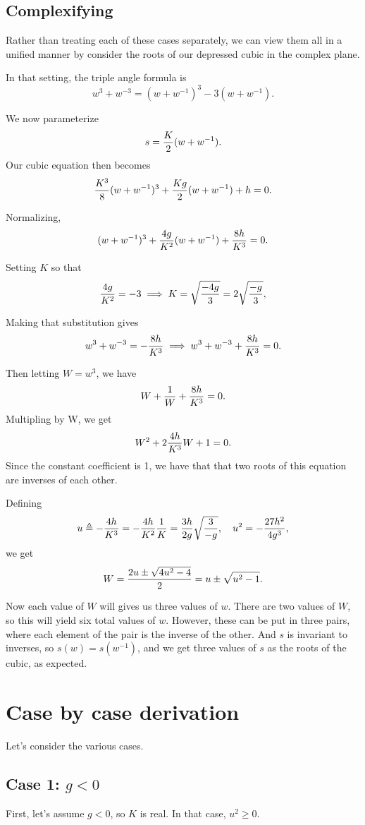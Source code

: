 \documentclass[10pt]{article}
\begin{document}
\subsection*{Complexifying}
Rather than treating each of these cases separately, we can view them all in a unified manner by consider the roots of our depressed cubic in the complex plane.

In that setting, the triple angle formula is $$ w^3 + w^{-3} = (w + w^{-1})^3 - 3 (w + w^{-1}).$$

We now parameterize $$ s = {K \over 2} (w + w^{-1}).$$ Our cubic  equation then becomes
$$ {K^3 \over 8} (w + w^{-1})^3 + {K g \over 2}(w + w^{-1}) + h = 0.$$

Normalizing,
$$ (w + w^{-1})^3 + {4 g \over K^2} (w + w^{-1}) + {8 h \over K^3} = 0.$$

Setting $K$ so that $$ {4 g \over K^2} = -3 \implies K = \sqrt {-4 g \over 3} = 2 \sqrt{-g \over 3},$$

Making that substitution gives $$ w^3 + w^{-3} = -{ 8 h \over K^3} \implies w^3 + w^{-3} + {8 h \over K^3} = 0.$$

Then letting $W = w^3$, we have $$ W + {1 \over W} + {8h \over K^3} = 0.$$
Multipling by W, we get $$ W^2 + 2 {4 h \over K^3} W + 1 =  0.$$ Since the constant coefficient is 1, we have that that two roots of this equation are inverses of each other.

Defining $$ u \triangleq -{4 h \over K^3} = -{4 h \over K^2}{1 \over K} = { 3 h \over 2 g} \sqrt{ 3 \over -g}, \quad u^2 = -{27 h^2 \over 4 g^3}, $$ we get  $$ W =  {2 u \pm \sqrt{4 u^2 - 4} \over 2} = u \pm \sqrt{u^2 -1}.$$

Now each value of $W$ will gives us three values of $w$. There are two values of $W$, so this will yield six total values of $w$. However, these can be put in three pairs, where each element of the pair is the inverse of the other. And $s$ is invariant to inverses, so $s(w) = s(w^{-1})$, and we get three values of $s$ as the roots of the cubic, as expected.
\section*{Case by case derivation}

Let's consider the various cases.

\subsection*{Case 1: $g<0$}
First, let's assume $g < 0$, so $K$ is real. In that case, $u^2 \ge 0$.
\end{document}
